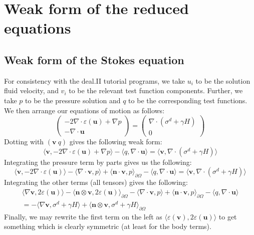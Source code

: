 \documentclass[reqno]{article}
\begin{document}
  \section{Weak form of the reduced equations}
  \subsection{Weak form of the Stokes equation}
  For consistency with the deal.II tutorial programs, we take $u_i$ to be the
  solution fluid velocity, and $v_i$ to be the relevant test function
  components.
  Further, we take $p$ to be the pressure solution and $q$ to be the
  corresponding test functions.
  We then arrange our equations of motion as follows:
  \begin{equation}
    \begin{pmatrix}
      -2 \nabla \cdot \varepsilon(\mathbf{u}) + \nabla p\\
      - \nabla \cdot \mathbf{u}
    \end{pmatrix}
    =
    \begin{pmatrix}
      \nabla \cdot (\sigma^d + \gamma H) \\
      0
    \end{pmatrix}
  \end{equation}
  Dotting with $(\mathbf{v} \: q)$ gives the following weak form:
  \begin{equation}
    \langle \mathbf{v}, -2 \nabla \cdot \varepsilon(\mathbf{u}) + \nabla p \rangle
    - \langle q, \nabla \cdot \mathbf{u} \rangle
    =
    \langle \mathbf{v}, \nabla \cdot (\sigma^d + \gamma H) \rangle
  \end{equation}
  Integrating the pressure term by parts gives us the following:
  \begin{equation}
    \langle \mathbf{v}, -2 \nabla \cdot \varepsilon(\mathbf{u}) \rangle
    - \langle \nabla \cdot \mathbf{v}, p \rangle
    + \langle \mathbf{n} \cdot \mathbf{v}, p \rangle_{\partial \Omega}
    - \langle q, \nabla \cdot \mathbf{u} \rangle
    =
    \langle \mathbf{v}, \nabla \cdot (\sigma^d + \gamma H) \rangle
  \end{equation}
  Integrating the other terms (all tensors) gives the following:
  \begin{equation}
    \begin{split}
    \langle \nabla \mathbf{v}, 2 \varepsilon(\mathbf{u}) \rangle
    -\langle \mathbf{n} \otimes \mathbf{v}, 2 \varepsilon(\mathbf{u}) \rangle_{\partial \Omega}
    - \langle \nabla \cdot \mathbf{v}, p \rangle
    + \langle \mathbf{n} \cdot \mathbf{v}, p \rangle_{\partial \Omega}
    - \langle q, \nabla \cdot \mathbf{u} \rangle \\
    =
    -\langle \nabla \mathbf{v}, \sigma^d + \gamma H \rangle
    + \langle \mathbf{n} \otimes \mathbf{v}, \sigma^d + \gamma H \rangle_{\partial \Omega}
    \end{split}
  \end{equation}
  Finally, we may rewrite the first term on the left as $\langle
  \varepsilon(\mathbf{v}), 2 \varepsilon(\mathbf{u}) \rangle$ to get something
  which is clearly symmetric (at least for the body terms).
\end{document}
